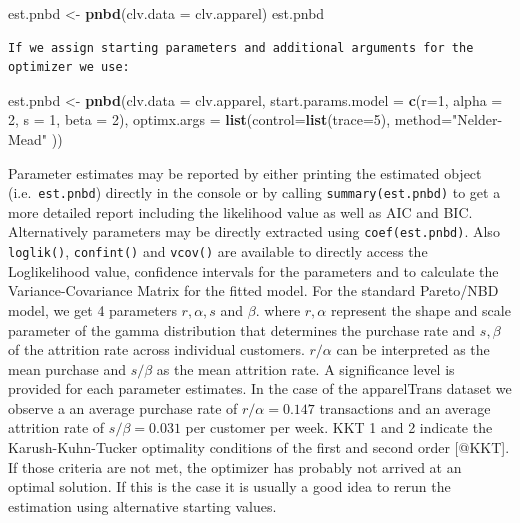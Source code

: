 \documentclass[
]{article}
\newenvironment{Shaded}{\begin{snugshade}}{\end{snugshade}}
\newcommand{\AttributeTok}[1]{\textcolor[rgb]{0.13,0.29,0.53}{#1}}
\newcommand{\DecValTok}[1]{\textcolor[rgb]{0.00,0.00,0.81}{#1}}
\newcommand{\FunctionTok}[1]{\textcolor[rgb]{0.13,0.29,0.53}{\textbf{#1}}}
\newcommand{\NormalTok}[1]{#1}
\newcommand{\OtherTok}[1]{\textcolor[rgb]{0.56,0.35,0.01}{#1}}
\newcommand{\StringTok}[1]{\textcolor[rgb]{0.31,0.60,0.02}{#1}}
\begin{document}
\begin{Shaded}
\begin{Highlighting}[]
\NormalTok{    est.pnbd }\OtherTok{\textless{}{-}} \FunctionTok{pnbd}\NormalTok{(}\AttributeTok{clv.data =}\NormalTok{ clv.apparel)}
\NormalTok{    est.pnbd}
\end{Highlighting}
\end{Shaded}

\begin{verbatim}
If we assign starting parameters and additional arguments for the optimizer we use: 
\end{verbatim}

\begin{Shaded}
\begin{Highlighting}[]
\NormalTok{   est.pnbd }\OtherTok{\textless{}{-}} \FunctionTok{pnbd}\NormalTok{(}\AttributeTok{clv.data =}\NormalTok{ clv.apparel, }
                    \AttributeTok{start.params.model =} \FunctionTok{c}\NormalTok{(}\AttributeTok{r=}\DecValTok{1}\NormalTok{, }\AttributeTok{alpha =} \DecValTok{2}\NormalTok{, }\AttributeTok{s =} \DecValTok{1}\NormalTok{, }\AttributeTok{beta =} \DecValTok{2}\NormalTok{), }
                    \AttributeTok{optimx.args =} \FunctionTok{list}\NormalTok{(}\AttributeTok{control=}\FunctionTok{list}\NormalTok{(}\AttributeTok{trace=}\DecValTok{5}\NormalTok{),}
                                       \AttributeTok{method=}\StringTok{"Nelder{-}Mead"} 
\NormalTok{                                       ))}
\end{Highlighting}
\end{Shaded}

Parameter estimates may be reported by either printing the estimated
object (i.e.~\texttt{est.pnbd}) directly in the console or by calling
\texttt{summary(est.pnbd)} to get a more detailed report including the
likelihood value as well as AIC and BIC. Alternatively parameters may be
directly extracted using \texttt{coef(est.pnbd)}. Also
\texttt{loglik()}, \texttt{confint()} and \texttt{vcov()} are available
to directly access the Loglikelihood value, confidence intervals for the
parameters and to calculate the Variance-Covariance Matrix for the
fitted model. For the standard Pareto/NBD model, we get 4 parameters
\(r, \alpha, s\) and \(\beta\). where \(r,\alpha\) represent the shape
and scale parameter of the gamma distribution that determines the
purchase rate and \(s,\beta\) of the attrition rate across individual
customers. \(r/\alpha\) can be interpreted as the mean purchase and
\(s/\beta\) as the mean attrition rate. A significance level is provided
for each parameter estimates. In the case of the apparelTrans dataset we
observe a an average purchase rate of \(r/\alpha=0.147\) transactions
and an average attrition rate of \(s/\beta=0.031\) per customer per
week. KKT 1 and 2 indicate the Karush-Kuhn-Tucker optimality conditions
of the first and second order {[}@KKT{]}. If those criteria are not met,
the optimizer has probably not arrived at an optimal solution. If this
is the case it is usually a good idea to rerun the estimation using
alternative starting values.
\end{document}
